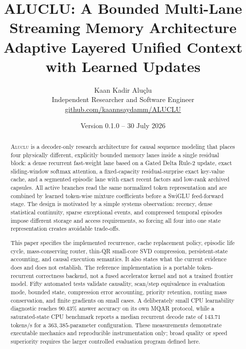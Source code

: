 \documentclass[11pt,a4paper]{article}
\title{
  \vspace{-1.2cm}
  {\color{AlucluNavy}\bfseries
  ALUCLU: A Bounded Multi-Lane Streaming Memory Architecture}\\[0.35em]
  \large Adaptive Layered Unified Context with Learned Updates
}
\author{Kaan Kadir Aluçlu\\
\small Independent Researcher and Software Engineer\\
\small \href{https://github.com/kaannsaydamm/ALUCLU}{github.com/kaannsaydamm/ALUCLU}}
\date{Version 0.1.0 -- 30 July 2026}
\newcommand{\ALUCLU}{\textsc{Aluclu}\xspace}
\begin{document}
\maketitle

\begin{abstract}
\ALUCLU is a decoder-only research architecture for causal sequence modeling
that places four physically different, explicitly bounded memory lanes inside
a single residual block: a dense recurrent fast-weight lane based on a
Gated Delta Rule-2 update, exact sliding-window softmax attention, a
fixed-capacity residual-surprise exact key-value cache, and a segmented
episodic lane with exact recent factors and low-rank archived capsules.
All active branches read the same normalized token representation and are
combined by learned token-wise mixture coefficients before a SwiGLU
feed-forward stage. The design is motivated by a simple systems observation:
recency, dense statistical continuity, sparse exceptional events, and
compressed temporal episodes impose different storage and access
requirements, so forcing all four into one state representation creates
avoidable trade-offs.

This paper specifies the implemented recurrence, cache replacement policy,
episodic life cycle, mass-conserving router, thin-QR small-core SVD
compression, persistent-state accounting, and causal execution semantics. It
also states what the current evidence does and does not establish. The
reference implementation is a portable token-recurrent correctness backend,
not a fused accelerator kernel and not a trained frontier model. Fifty
automated tests validate causality, scan/step equivalence in evaluation mode,
bounded state, compression error accounting, priority retention, routing mass
conservation, and finite gradients on small cases. A deliberately small CPU
learnability diagnostic reaches \(90.43\%\) answer accuracy on its own MQAR
protocol, while a saturated-state CPU benchmark reports a median recurrent
decode rate of \(143.71\) tokens/s for a \(363{,}385\)-parameter configuration.
These measurements demonstrate executable mechanics and reproducible
instrumentation only; broad quality or speed superiority requires the
larger controlled evaluation program defined here.
\end{abstract}
\end{document}

